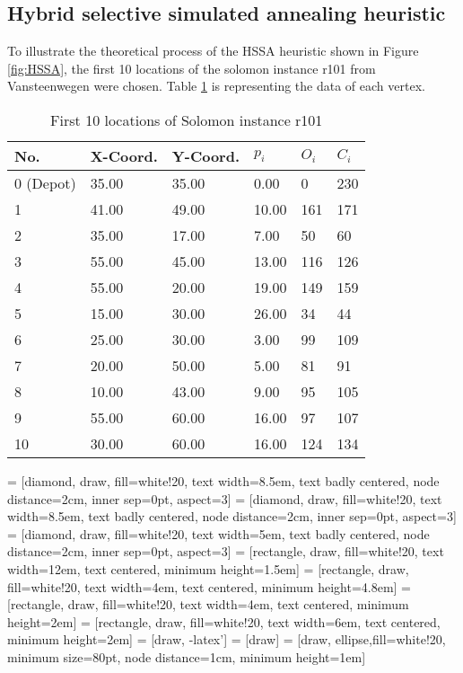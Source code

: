 \documentclass[final,5p,times,twocolumn]{elsarticle}
\begin{document}
\subsection{Hybrid selective simulated annealing heuristic}
To illustrate the theoretical process of the HSSA heuristic shown in Figure \ref{fig:HSSA}, the first 10 locations of the solomon instance r101 from Vansteenwegen \cite{Vansteenwegen:2011op} were chosen. Table \ref{tab:r101} is representing the data of each vertex.

{\renewcommand{\arraystretch}{1.2}
\begin{table}[htbp]
\caption{First 10 locations of Solomon instance r101}
\centering
\begin{tabularx}{\linewidth}{X l l l l l}
\hline 
No. & X-Coord. & Y-Coord. & $p_{i}$ & $O_{i}$ & $C_{i}$\\
\hline
  0 (Depot)& 35.00& 35.00& 0.00& 0& 230\\
  1& 41.00& 49.00& 10.00& 161& 171\\
  2& 35.00& 17.00& 7.00& 50& 60\\
  3& 55.00& 45.00& 13.00& 116& 126\\
  4& 55.00& 20.00& 19.00& 149& 159\\
  5& 15.00& 30.00& 26.00& 34& 44\\
  6& 25.00& 30.00& 3.00& 99& 109\\
  7& 20.00& 50.00& 5.00& 81& 91\\
  8& 10.00& 43.00& 9.00& 95& 105\\
  9& 55.00& 60.00& 16.00& 97& 107\\
 10& 30.00& 60.00& 16.00& 124& 134\\
\hline
\end{tabularx}
\label{tab:r101}
\end{table} 


 = [diamond, draw, fill=white!20, 
    text width=8.5em, text badly centered, node distance=2cm, inner sep=0pt, aspect=3]
 = [diamond, draw, fill=white!20, 
    text width=8.5em, text badly centered, node distance=2cm, inner sep=0pt, aspect=3]
 = [diamond, draw, fill=white!20, 
    text width=5em, text badly centered, node distance=2cm, inner sep=0pt, aspect=3]
 = [rectangle, draw, fill=white!20, 
    text width=12em, text centered, minimum height=1.5em]
 = [rectangle, draw, fill=white!20, 
    text width=4em, text centered, minimum height=4.8em]
 = [rectangle, draw, fill=white!20, 
    text width=4em, text centered, minimum height=2em]
 = [rectangle, draw, fill=white!20, 
    text width=6em, text centered, minimum height=2em]
 = [draw, -latex']
 = [draw]
 = [draw, ellipse,fill=white!20, minimum size=80pt, node distance=1cm, minimum height=1em]
   
}
\end{document}

